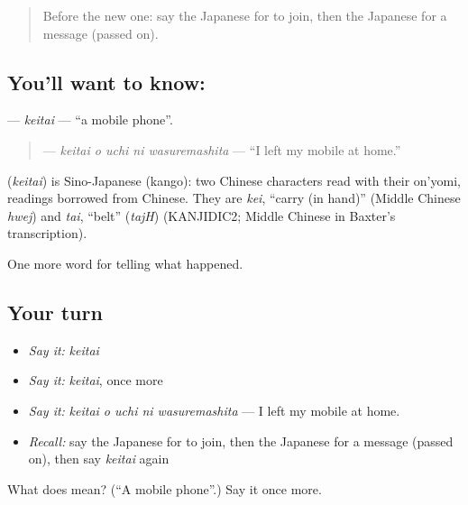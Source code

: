 \label{lesson:JA-C307-keitai}



\begin{quote}
Before the new one: say the Japanese for to join, then the Japanese for a message (passed on).
\end{quote}

\subsection*{You'll want to know: }
\textbf{} — \emph{keitai} — \textquotedblleft{}a mobile phone\textquotedblright{}.

\begin{quote}
\textbf{  } — \emph{keitai o uchi ni wasuremashita} — \textquotedblleft{}I left my mobile at home.\textquotedblright{}
\end{quote}

\begin{cousinweb}
\textbf{} (\emph{keitai}) is Sino-Japanese (kango): two Chinese characters read with their on'yomi, readings borrowed from Chinese. They are \emph{kei}, \textquotedblleft{}carry (in hand)\textquotedblright{} (Middle Chinese \emph{hwej}) and \emph{tai}, \textquotedblleft{}belt\textquotedblright{} (\emph{tajH}) (KANJIDIC2; Middle Chinese in Baxter's transcription).
\end{cousinweb}

\begin{grammarlens}[title={What you've built}]
One more word for telling what happened.
\end{grammarlens}

\subsection*{Your turn}
\begin{itemize}
\raggedright
  \item \emph{Say it:} \emph{keitai}
  \item \emph{Say it:} \emph{keitai}, once more
  \item \emph{Say it:} \emph{keitai o uchi ni wasuremashita} — I left my mobile at home.
  \item \emph{Recall:} say the Japanese for to join, then the Japanese for a message (passed on), then say \emph{keitai} again
\end{itemize}

\begin{tcolorbox}[breakable,colback=teal!4,colframe=teal!35!black,title={Before you move on}]
What does  mean? (\textquotedblleft{}A mobile phone\textquotedblright{}.) Say it once more.
\end{tcolorbox}
